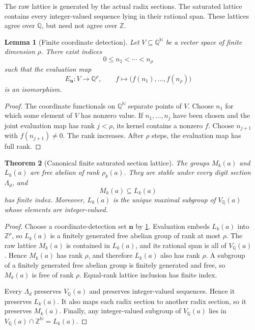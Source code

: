 \documentclass[11pt]{article}
\newtheorem{theorem}{Theorem}[section]
\newtheorem{lemma}[theorem]{Lemma}
\theoremstyle{definition}
\theoremstyle{remark}
\begin{document}
The raw lattice is generated by the actual radix sections.  The saturated lattice contains every integer-valued sequence lying in their rational span.  These lattices agree over \(\mathbb Q\), but need not agree over \(\mathbb Z\).

\begin{lemma}[Finite coordinate detection]
\label{lem:block06-coordinate-detection}
Let \(V\subseteq\mathbb Q^{\mathbb N}\) be a vector space of finite dimension \(\rho\).  There exist indices
\[
0\leq n_1<\cdots<n_\rho
\]
such that the evaluation map
\[
E_{\mathbf n}:V\longrightarrow\mathbb Q^\rho,
\qquad
f\longmapsto
\bigl(f(n_1),\ldots,f(n_\rho)\bigr)
\]
is an isomorphism.
\end{lemma}

\begin{proof}
The coordinate functionals on \(\mathbb Q^{\mathbb N}\) separate points of \(V\).  Choose \(n_1\) for which some element of \(V\) has nonzero value.  If \(n_1,\ldots,n_j\) have been chosen and the joint evaluation map has rank \(j<\rho\), its kernel contains a nonzero \(f\).  Choose \(n_{j+1}\) with \(f(n_{j+1})\neq0\).  The rank increases.  After \(\rho\) steps, the evaluation map has full rank.
\end{proof}

\begin{theorem}[Canonical finite saturated section lattice]
\label{thm:block06-saturation}
The groups \(M_k(a)\) and \(L_k(a)\) are free abelian of rank \(\rho_k(a)\).  They are stable under every digit section \(\Lambda_d\), and
\[
M_k(a)\subseteq L_k(a)
\]
has finite index.  Moreover, \(L_k(a)\) is the unique maximal subgroup of \(V_{\mathbb Q}(a)\) whose elements are integer-valued.
\end{theorem}

\begin{proof}
Choose a coordinate-detection set \(\mathbf n\) by \cref{lem:block06-coordinate-detection}.  Evaluation embeds \(L_k(a)\) into \(\mathbb Z^\rho\), so \(L_k(a)\) is a finitely generated free abelian group of rank at most \(\rho\).  The raw lattice \(M_k(a)\) is contained in \(L_k(a)\), and its rational span is all of \(V_{\mathbb Q}(a)\).  Hence \(M_k(a)\) has rank \(\rho\), and therefore \(L_k(a)\) also has rank \(\rho\).  A subgroup of a finitely generated free abelian group is finitely generated and free, so \(M_k(a)\) is free of rank \(\rho\).  Equal-rank lattice inclusion has finite index.

Every \(\Lambda_d\) preserves \(V_{\mathbb Q}(a)\) and preserves integer-valued sequences.  Hence it preserves \(L_k(a)\).  It also maps each radix section to another radix section, so it preserves \(M_k(a)\).  Finally, any integer-valued subgroup of \(V_{\mathbb Q}(a)\) lies in \(V_{\mathbb Q}(a)\cap\mathbb Z^{\mathbb N}=L_k(a)\).
\end{proof}
\end{document}
